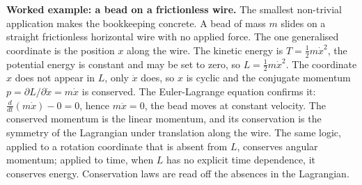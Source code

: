 \textbf{Worked example: a bead on a frictionless wire.} The smallest
non-trivial application makes the bookkeeping concrete. A bead of mass
$m$ slides on a straight frictionless horizontal wire with no applied
force. The one generalised coordinate is the position $x$ along the
wire. The kinetic energy is $T = \tfrac12 m \dot{x}^2$, the potential
energy is constant and may be set to zero, so $L = \tfrac12 m \dot{x}^2$.
The coordinate $x$ does not appear in $L$, only $\dot{x}$ does, so $x$
is cyclic and the conjugate momentum $p = \partial L/\partial\dot{x} =
m\dot{x}$ is conserved. The Euler-Lagrange equation confirms it:
$\tfrac{d}{dt}(m\dot{x}) - 0 = 0$, hence $m\ddot{x} = 0$, the bead
moves at constant velocity. The conserved momentum is the linear
momentum, and its conservation is the symmetry of the Lagrangian under
translation along the wire. The same logic, applied to a rotation
coordinate that is absent from $L$, conserves angular momentum; applied
to time, when $L$ has no explicit time dependence, it conserves energy.
Conservation laws are read off the absences in the Lagrangian.

